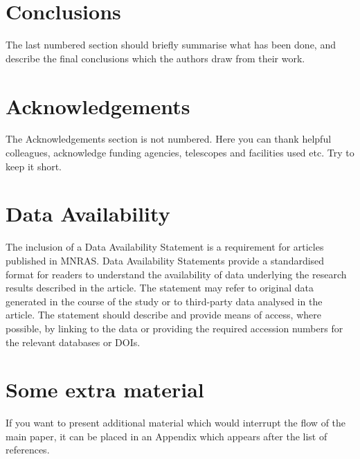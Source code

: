 \documentclass[fleqn,usenatbib]{mnras}
\begin{document}



\section{Conclusions}

The last numbered section should briefly summarise what has been done, and describe
the final conclusions which the authors draw from their work.

\section*{Acknowledgements}

The Acknowledgements section is not numbered. Here you can thank helpful
colleagues, acknowledge funding agencies, telescopes and facilities used etc.
Try to keep it short.

\section*{Data Availability}

 
The inclusion of a Data Availability Statement is a requirement for articles published in MNRAS. Data Availability Statements provide a standardised format for readers to understand the availability of data underlying the research results described in the article. The statement may refer to original data generated in the course of the study or to third-party data analysed in the article. The statement should describe and provide means of access, where possible, by linking to the data or providing the required accession numbers for the relevant databases or DOIs.












\appendix

\section{Some extra material}

If you want to present additional material which would interrupt the flow of the main paper,
it can be placed in an Appendix which appears after the list of references.



\bsp	%
\label{lastpage}
\end{document}
